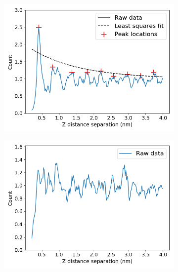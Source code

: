 \documentclass[journal=jpcbfk,manusciprt=article]{achemso}
\begin{document}
\begin{figure}
\begin{subfigure}{0.45\textwidth}
  \end{subfigure}  
  \begin{subfigure}{0.45\textwidth}
  \centering
  \includegraphics[width=\textwidth]{z_correlation_sandwich_disordered.png}
  \caption{}\label{fig:z_correlation_sandwich_disordered}
  \end{subfigure}  
  \begin{subfigure}{0.45\textwidth}
  \centering
  \includegraphics[width=\textwidth]{z_correlation_offset_disordered.png}
  \caption{}\label{fig:z_correlation_offset_disordered}
  \end{subfigure}  
  \caption{}\label{fig:correlation}
  \end{figure}
  
\end{document}
